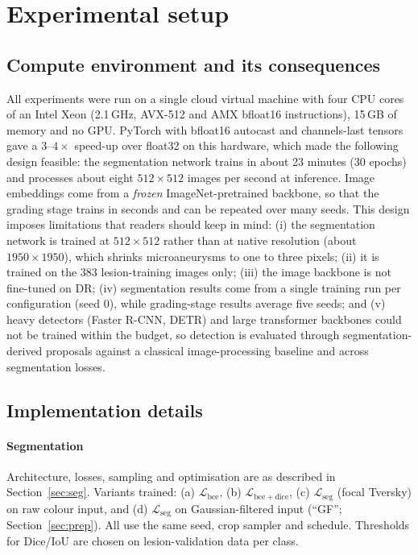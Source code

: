 \section{Experimental setup}
\label{sec:setup}

\subsection{Compute environment and its consequences}
All experiments were run on a single cloud virtual machine with four CPU cores of an Intel Xeon (2.1\,GHz, AVX-512 and AMX bfloat16 instructions), 15\,GB of memory and no GPU. PyTorch \citep{paszke2019pytorch} with bfloat16 autocast and channels-last tensors gave a $3$--$4\times$ speed-up over float32 on this hardware, which made the following design feasible: the segmentation network trains in about 23 minutes (30 epochs) and processes about eight $512\times512$ images per second at inference. Image embeddings come from a \emph{frozen} ImageNet-pretrained backbone, so that the grading stage trains in seconds and can be repeated over many seeds. This design imposes limitations that readers should keep in mind: (i) the segmentation network is trained at $512\times512$ rather than at native resolution (about $1950\times1950$), which shrinks microaneurysms to one to three pixels; (ii) it is trained on the 383 lesion-training images only; (iii) the image backbone is not fine-tuned on DR; (iv) segmentation results come from a single training run per configuration (seed 0), while grading-stage results average five seeds; and (v) heavy detectors (Faster R-CNN, DETR) and large transformer backbones could not be trained within the budget, so detection is evaluated through segmentation-derived proposals against a classical image-processing baseline and across segmentation losses.

\subsection{Implementation details}
\paragraph{Segmentation} Architecture, losses, sampling and optimisation are as described in Section~\ref{sec:seg}. Variants trained: (a) $\mathcal L_{\mathrm{bce}}$, (b) $\mathcal L_{\mathrm{bce+dice}}$, (c) $\mathcal L_{\mathrm{seg}}$ (focal Tversky) on raw colour input, and (d) $\mathcal L_{\mathrm{seg}}$ on Gaussian-filtered input (``GF''; Section~\ref{sec:prep}). All use the same seed, crop sampler and schedule. Thresholds for Dice/IoU are chosen on lesion-validation data per class.

